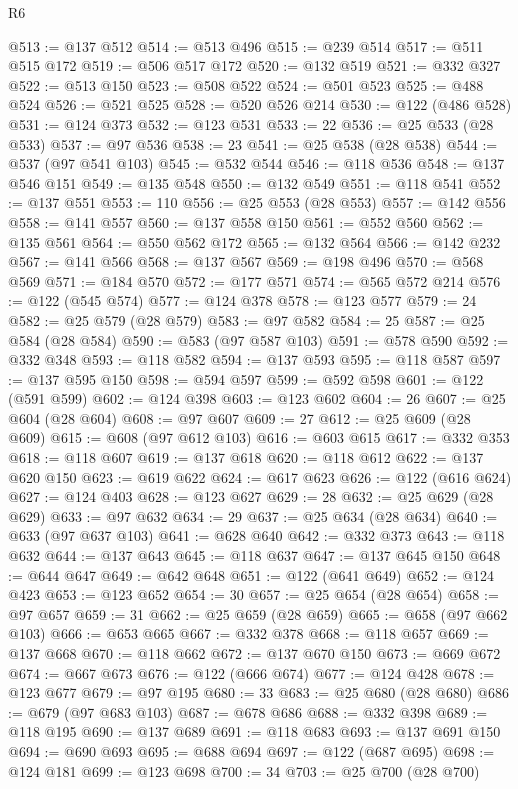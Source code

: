 \begin{lexlean}{R6}
\begin{coremodule}
@513 := @137 @512
@514 := @513 @496
@515 := @239 @514
@517 := @511 @515 @172
@519 := @506 @517 @172
@520 := @132 @519
@521 := @332 @327
@522 := @513 @150
@523 := @508 @522
@524 := @501 @523
@525 := @488 @524
@526 := @521 @525
@528 := @520 @526 @214
@530 := @122 (@486 @528)
@531 := @124 @373
@532 := @123 @531
@533 := 22
@536 := @25 @533 (@28 @533)
@537 := @97 @536
@538 := 23
@541 := @25 @538 (@28 @538)
@544 := @537 (@97 @541 @103)
@545 := @532 @544
@546 := @118 @536
@548 := @137 @546 @151
@549 := @135 @548
@550 := @132 @549
@551 := @118 @541
@552 := @137 @551
@553 := 110
@556 := @25 @553 (@28 @553)
@557 := @142 @556
@558 := @141 @557
@560 := @137 @558 @150
@561 := @552 @560
@562 := @135 @561
@564 := @550 @562 @172
@565 := @132 @564
@566 := @142 @232
@567 := @141 @566
@568 := @137 @567
@569 := @198 @496
@570 := @568 @569
@571 := @184 @570
@572 := @177 @571
@574 := @565 @572 @214
@576 := @122 (@545 @574)
@577 := @124 @378
@578 := @123 @577
@579 := 24
@582 := @25 @579 (@28 @579)
@583 := @97 @582
@584 := 25
@587 := @25 @584 (@28 @584)
@590 := @583 (@97 @587 @103)
@591 := @578 @590
@592 := @332 @348
@593 := @118 @582
@594 := @137 @593
@595 := @118 @587
@597 := @137 @595 @150
@598 := @594 @597
@599 := @592 @598
@601 := @122 (@591 @599)
@602 := @124 @398
@603 := @123 @602
@604 := 26
@607 := @25 @604 (@28 @604)
@608 := @97 @607
@609 := 27
@612 := @25 @609 (@28 @609)
@615 := @608 (@97 @612 @103)
@616 := @603 @615
@617 := @332 @353
@618 := @118 @607
@619 := @137 @618
@620 := @118 @612
@622 := @137 @620 @150
@623 := @619 @622
@624 := @617 @623
@626 := @122 (@616 @624)
@627 := @124 @403
@628 := @123 @627
@629 := 28
@632 := @25 @629 (@28 @629)
@633 := @97 @632
@634 := 29
@637 := @25 @634 (@28 @634)
@640 := @633 (@97 @637 @103)
@641 := @628 @640
@642 := @332 @373
@643 := @118 @632
@644 := @137 @643
@645 := @118 @637
@647 := @137 @645 @150
@648 := @644 @647
@649 := @642 @648
@651 := @122 (@641 @649)
@652 := @124 @423
@653 := @123 @652
@654 := 30
@657 := @25 @654 (@28 @654)
@658 := @97 @657
@659 := 31
@662 := @25 @659 (@28 @659)
@665 := @658 (@97 @662 @103)
@666 := @653 @665
@667 := @332 @378
@668 := @118 @657
@669 := @137 @668
@670 := @118 @662
@672 := @137 @670 @150
@673 := @669 @672
@674 := @667 @673
@676 := @122 (@666 @674)
@677 := @124 @428
@678 := @123 @677
@679 := @97 @195
@680 := 33
@683 := @25 @680 (@28 @680)
@686 := @679 (@97 @683 @103)
@687 := @678 @686
@688 := @332 @398
@689 := @118 @195
@690 := @137 @689
@691 := @118 @683
@693 := @137 @691 @150
@694 := @690 @693
@695 := @688 @694
@697 := @122 (@687 @695)
@698 := @124 @181
@699 := @123 @698
@700 := 34
@703 := @25 @700 (@28 @700)

\end{coremodule}
\end{lexlean}
